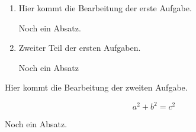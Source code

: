 \documentclass[sheet=3, task=6, prefix]{exercise}
\begin{document}
    \begin{enumerate}
      \item Hier kommt die Bearbeitung der erste Aufgabe.
      
        Noch ein Absatz.
        
      \item Zweiter Teil der ersten Aufgaben.
      
        Noch ein Absatz
    \end{enumerate}
  
    Hier kommt die Bearbeitung der zweiten Aufgabe.
    
    \[ a^2+b^2=c^2 \]
    
    Noch ein Absatz.
\end{document}

